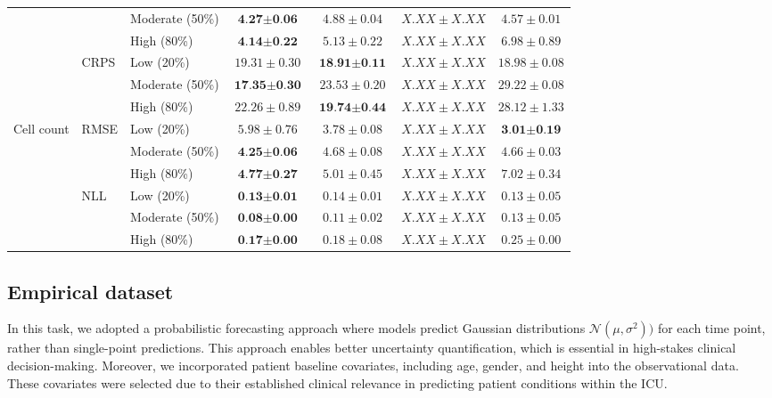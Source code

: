 \documentclass[preprint,12pt]{elsarticle}
\begin{document}
\begin{table}[ht]
{\begin{tabular}{l l l c c c c}
& & Moderate (50\%) & $\textbf{4.27} \pm \textbf{0.06}$ & $4.88 \pm 0.04$ & $X.XX \pm X.XX$ & $4.57 \pm 0.01$ \\
& & High (80\%) & $\textbf{4.14} \pm \textbf{0.22}$ & $5.13 \pm 0.22$ & $X.XX \pm X.XX$ & $6.98 \pm 0.89$ \\
\cmidrule{2-7}
& \multirow{3}{*}{CRPS} & Low (20\%) & $19.31 \pm 0.30$ & $\textbf{18.91} \pm \textbf{0.11}$ & $X.XX \pm X.XX$ & $18.98 \pm 0.08$ \\
& & Moderate (50\%) & $\textbf{17.35} \pm \textbf{0.30}$ & $23.53 \pm 0.20$ & $X.XX \pm X.XX$ & $29.22 \pm 0.08$ \\
& & High (80\%) & $22.26 \pm 0.89$ & $\textbf{19.74} \pm \textbf{0.44}$ & $X.XX \pm X.XX$ & $28.12 \pm 1.33$ \\
\midrule
\multirow{6}{*}{Cell count}
& \multirow{3}{*}{RMSE} & Low (20\%) & $5.98 \pm 0.76$ & $3.78 \pm 0.08$ & $X.XX \pm X.XX$ & $\textbf{3.01} \pm \textbf{0.19}$ \\
& & Moderate (50\%) & $\textbf{4.25} \pm \textbf{0.06}$ & $4.68 \pm 0.08$ & $X.XX \pm X.XX$ & $4.66 \pm 0.03$ \\
& & High (80\%) & $\textbf{4.77} \pm \textbf{0.27}$ & $5.01 \pm 0.45$ & $X.XX \pm X.XX$ & $7.02 \pm 0.34$ \\
\cmidrule{2-7}
& \multirow{3}{*}{NLL} & Low (20\%) & $\textbf{0.13} \pm \textbf{0.01}$ & $0.14 \pm 0.01$ & $X.XX \pm X.XX$ & $0.13 \pm 0.05$ \\
& & Moderate (50\%) & $\textbf{0.08} \pm \textbf{0.00}$ & $0.11 \pm 0.02$ & $X.XX \pm X.XX$ & $0.13 \pm 0.05$ \\
& & High (80\%) & $\textbf{0.17} \pm \textbf{0.00}$ & $0.18 \pm 0.08$ & $X.XX \pm X.XX$ & $0.25 \pm 0.00$ \\
\bottomrule
\end{tabular}
}
\end{table}
\subsection{Empirical dataset}
In this task, we adopted a probabilistic forecasting approach where models predict Gaussian distributions $\mathcal{N}(\mu,\sigma^2))$ for each time point, rather than single-point predictions. This approach enables better uncertainty quantification, which is essential in high-stakes clinical decision-making. Moreover, we incorporated patient baseline covariates, including age, gender, and height into the observational data. These covariates were selected due to their established clinical relevance in predicting patient conditions within the ICU. 
\end{document}

